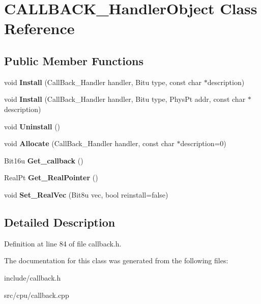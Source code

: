 \hypertarget{classCALLBACK__HandlerObject}{\section{C\-A\-L\-L\-B\-A\-C\-K\-\_\-\-Handler\-Object Class Reference}
\label{classCALLBACK__HandlerObject}
}
\subsection*{Public Member Functions}
\begin{DoxyCompactItemize}
\item 
\hypertarget{classCALLBACK__HandlerObject_af226371a5aa8f9b18d8ffd5fdec5e839}{void {\bfseries Install} (Call\-Back\-\_\-\-Handler handler, Bitu type, const char $\ast$description)}\label{classCALLBACK__HandlerObject_af226371a5aa8f9b18d8ffd5fdec5e839}

\item 
\hypertarget{classCALLBACK__HandlerObject_a3ed2e7ffbce75489eab79c5e3a4903c1}{void {\bfseries Install} (Call\-Back\-\_\-\-Handler handler, Bitu type, Phys\-Pt addr, const char $\ast$description)}\label{classCALLBACK__HandlerObject_a3ed2e7ffbce75489eab79c5e3a4903c1}

\item 
\hypertarget{classCALLBACK__HandlerObject_a7155b838519155e526839d960c2ab984}{void {\bfseries Uninstall} ()}\label{classCALLBACK__HandlerObject_a7155b838519155e526839d960c2ab984}

\item 
\hypertarget{classCALLBACK__HandlerObject_ac8b4fa624c28592a6b9b89a31c1d4589}{void {\bfseries Allocate} (Call\-Back\-\_\-\-Handler handler, const char $\ast$description=0)}\label{classCALLBACK__HandlerObject_ac8b4fa624c28592a6b9b89a31c1d4589}

\item 
\hypertarget{classCALLBACK__HandlerObject_a88c44d8f9d2c06850e7a1e529654df73}{Bit16u {\bfseries Get\-\_\-callback} ()}\label{classCALLBACK__HandlerObject_a88c44d8f9d2c06850e7a1e529654df73}

\item 
\hypertarget{classCALLBACK__HandlerObject_a6a9275192b60c2968f2525755c916fac}{Real\-Pt {\bfseries Get\-\_\-\-Real\-Pointer} ()}\label{classCALLBACK__HandlerObject_a6a9275192b60c2968f2525755c916fac}

\item 
\hypertarget{classCALLBACK__HandlerObject_a4f0eaae05d1bce0df9c0b9dfd2b8fcdc}{void {\bfseries Set\-\_\-\-Real\-Vec} (Bit8u vec, bool reinstall=false)}\label{classCALLBACK__HandlerObject_a4f0eaae05d1bce0df9c0b9dfd2b8fcdc}

\end{DoxyCompactItemize}


\subsection{Detailed Description}


Definition at line 84 of file callback.\-h.



The documentation for this class was generated from the following files\-:\begin{DoxyCompactItemize}
\item 
include/callback.\-h\item 
src/cpu/callback.\-cpp\end{DoxyCompactItemize}
